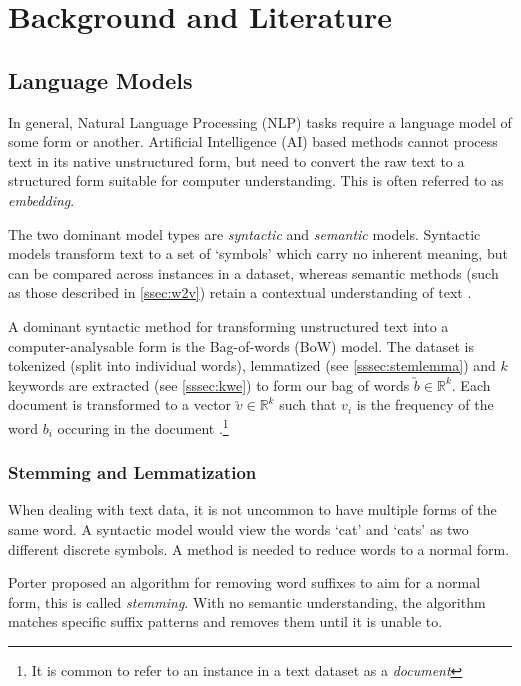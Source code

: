 \section{Background and Literature}\label{sec:lit}

\subsection{Language Models}\label{ssec:kwe}
In general, Natural Language Processing (NLP) tasks require a language model of some form or another.
Artificial Intelligence (AI) based methods cannot process text in its native unstructured form, but need to convert the
raw text to a structured form suitable for computer understanding. This is often referred to as \emph{embedding}.

The two dominant model types are \emph{syntactic} and \emph{semantic} models. 
Syntactic models transform text to a set of `symbols' which carry no inherent meaning, but can be 
compared across instances in a dataset, whereas semantic methods (such as those described in \autoref{ssec:w2v})
retain a contextual understanding of text \cite{Cambria2014}.

A dominant syntactic method for transforming unstructured text into a computer-analysable form is the Bag-of-words 
(BoW) model. 
The dataset is tokenized (split into individual words), lemmatized (see \autoref{sssec:stemlemma})
and $k$ keywords are extracted (see \autoref{sssec:kwe}) to form our bag of words $\utilde{b}\in \mathbb{R} ^{k}$.
Each document is
transformed to a vector $\utilde{v}\in \mathbb{R} ^{k}$ such that $v_i$ is the frequency 
of the word $b_i$ occuring in the document \cite{Cambria2014, StevenBirdEwanKlein2009, Zhang2010}.\footnote{It is common to refer to an instance in a text dataset as a \emph{document}}

\subsubsection{Stemming and Lemmatization}\label{sssec:stemlemma}
When dealing with text data, it is not uncommon to have multiple forms of the same word.  A syntactic model would view
the words `cat' and `cats' as two different discrete symbols.  A method is needed to reduce words to a normal form.

Porter \cite{Porter1980} proposed an algorithm for removing word suffixes to aim for a normal form, this is called
\emph{stemming}. With no semantic understanding, the algorithm matches specific suffix patterns and removes them
until it is unable to.

